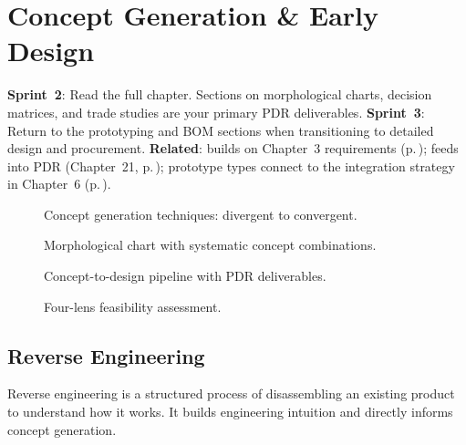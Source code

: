 \chapter{Concept Generation \& Early Design}\label{ch:concept}

\begin{tipbox}
\textbf{Sprint~2}: Read the full chapter. Sections on morphological charts, decision matrices, and trade studies are your primary PDR deliverables. \textbf{Sprint~3}: Return to the prototyping and BOM sections when transitioning to detailed design and procurement. \textbf{Related}: builds on Chapter~3 requirements (p.\,\pageref{ch:requirements}); feeds into PDR (Chapter~21, p.\,\pageref{ch:pdr}); prototype types connect to the integration strategy in Chapter~6 (p.\,\pageref{ch:integration}).
\end{tipbox}

\vspace{1em}

\begin{figure}[htbp]\centering

\caption{Concept generation techniques: divergent to convergent.}\end{figure}

\begin{figure}[htbp]\centering

\caption{Morphological chart with systematic concept combinations.}\end{figure}

\begin{figure}[htbp]\centering

\caption{Concept-to-design pipeline with PDR deliverables.}\end{figure}

\begin{figure}[htbp]\centering

\caption{Four-lens feasibility assessment.}\end{figure}

\section{Reverse Engineering}
Reverse engineering is a structured process of disassembling an existing product to understand how it works. It builds engineering intuition and directly informs concept generation.

